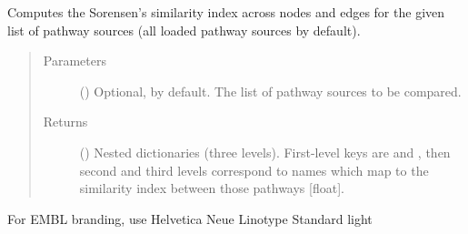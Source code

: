 \documentclass[letterpaper,10pt,english]{sphinxmanual}
\begin{document}
\begin{fulllineitems}

\begin{fulllineitems}
\label{\detokenize{main:pypath.main.PyPath.sorensen_pathways}}
Computes the Sorensen’s similarity index across nodes and edges
for the given list of pathway sources (all loaded pathway
sources by default).
\begin{quote}\begin{description}
\item[{Parameters}] \leavevmode
{} () \textendash{} Optional,  by default. The list of pathway sources
to be compared.

\item[{Returns}] \leavevmode
() \textendash{} Nested dictionaries (three levels). First-level
keys are  and , then second and third
levels correspond to  names which map
to the similarity index between those pathways {[}float{]}.

\end{description}\end{quote}

\end{fulllineitems}


\begin{fulllineitems}
\label{\detokenize{main:pypath.main.PyPath.source_diagram}}
\end{fulllineitems}


\begin{fulllineitems}
\label{\detokenize{main:pypath.main.PyPath.source_network}}
For EMBL branding, use Helvetica Neue Linotype Standard light

\end{fulllineitems}


\end{fulllineitems}
\end{document}

